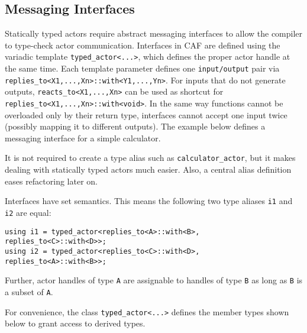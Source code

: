 \clearpage
\subsection{Messaging Interfaces}
\label{interface}

Statically typed actors require abstract messaging interfaces to allow the
compiler to type-check actor communication. Interfaces in CAF are defined using
the variadic template \lstinline^typed_actor<...>^, which defines the proper
actor handle at the same time. Each template parameter defines one
\lstinline^input/output^ pair via
\lstinline^replies_to<X1,...,Xn>::with<Y1,...,Yn>^. For inputs that do not
generate outputs, \lstinline^reacts_to<X1,...,Xn>^ can be used as shortcut for
\lstinline^replies_to<X1,...,Xn>::with<void>^. In the same way functions cannot
be overloaded only by their return type, interfaces cannot accept one input
twice (possibly mapping it to different outputs). The example below defines a
messaging interface for a simple calculator.


It is not required to create a type alias such as \lstinline^calculator_actor^,
but it makes dealing with statically typed actors much easier. Also, a central
alias definition eases refactoring later on.

Interfaces have set semantics. This means the following two type aliases
\lstinline^i1^ and \lstinline^i2^ are equal:

\begin{lstlisting}
using i1 = typed_actor<replies_to<A>::with<B>, replies_to<C>::with<D>>;
using i2 = typed_actor<replies_to<C>::with<D>, replies_to<A>::with<B>>;
\end{lstlisting}

Further, actor handles of type \lstinline^A^ are assignable to handles of type
\lstinline^B^ as long as \lstinline^B^ is a subset of \lstinline^A^.

For convenience, the class \lstinline^typed_actor<...>^ defines the member
types shown below to grant access to derived types.

